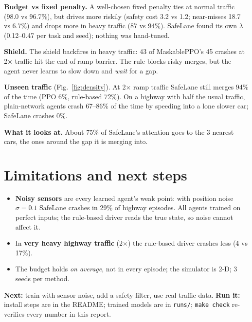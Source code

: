 \documentclass[10pt,twocolumn,a4paper]{article}
\newcommand{\term}[1]{\textbf{#1}}
\begin{document}
\term{Budget vs fixed penalty.} A well-chosen fixed penalty ties at normal traffic (98.0 vs 96.7\%), but drives more riskily (safety cost
3.2 vs 1.2; near-misses 18.7 vs 6.7\%) and drops more in heavy traffic (87 vs 94\%). SafeLane found its own $\lambda$ (0.12--0.47 per task
and seed); nothing was hand-tuned.

\term{Shield.} The shield backfires in heavy traffic: 43 of MaskablePPO's 45 crashes at 2$\times$ traffic hit the end-of-ramp barrier.
The rule blocks risky merges, but the agent never learns to slow down and \emph{wait} for a gap.

\term{Unseen traffic} (Fig.~\ref{fig:density}). At 2$\times$ ramp traffic SafeLane still merges 94\% of the time (PPO 6\%, rule-based 72\%).
On a highway with half the usual traffic, plain-network agents crash 67--86\% of the time by speeding into a lone slower car;
SafeLane crashes 0\%.

\term{What it looks at.} About 75\% of SafeLane's attention goes to the 3 nearest cars, the ones around the gap it is merging into.

\section{Limitations and next steps}
\begin{itemize}
\item \term{Noisy sensors} are every learned agent's weak point: with position noise $\sigma=0.1$ SafeLane crashes in 29\% of highway
episodes. All agents trained on perfect inputs; the rule-based driver reads the true state, so noise cannot affect it.
\item In \term{very heavy highway traffic} (2$\times$) the rule-based driver crashes less (4 vs 17\%).
\item The budget holds \emph{on average}, not in every episode; the simulator is 2-D; 3 seeds per method.
\end{itemize}
\term{Next:} train with sensor noise, add a safety filter, use real traffic data.
\term{Run it:} install steps are in the README; trained models are in \texttt{runs/}; \texttt{make check} re-verifies every number in this report.
\end{document}
